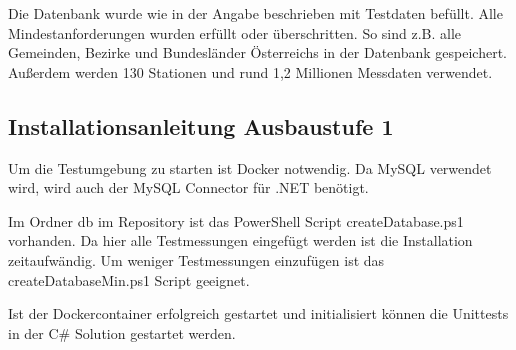 Die Datenbank wurde wie in der Angabe beschrieben mit Testdaten befüllt.
Alle Mindestanforderungen wurden erfüllt oder überschritten. So sind
z.B. alle Gemeinden, Bezirke und Bundesländer Österreichs in der
Datenbank gespeichert. Außerdem werden 130 Stationen und rund 1,2
Millionen Messdaten verwendet.


\subsection{Installationsanleitung Ausbaustufe
1}\label{installationsanleitung-ausbaustufe-1}

Um die Testumgebung zu starten ist Docker notwendig. Da MySQL verwendet
wird, wird auch der MySQL Connector für .NET benötigt.

Im Ordner db im Repository ist das PowerShell Script createDatabase.ps1
vorhanden. Da hier alle Testmessungen eingefügt werden ist die
Installation zeitaufwändig. Um weniger Testmessungen einzufügen ist das
createDatabaseMin.ps1 Script geeignet.

Ist der Dockercontainer erfolgreich gestartet und initialisiert können
die Unittests in der C\# Solution gestartet werden.